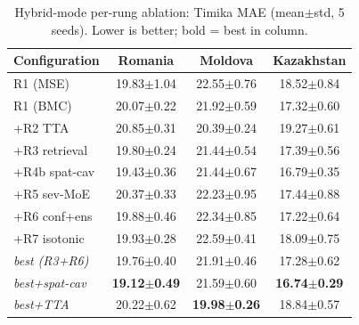 \begin{table}[t]
\centering\small
\caption{Hybrid-mode per-rung ablation: Timika MAE (mean$\pm$std, 5 seeds). Lower is better; bold = best in column.}
\label{tab:abl_fusion}
\setlength{\tabcolsep}{4pt}
\begin{tabular}{l c c c}
\toprule
Configuration & Romania & Moldova & Kazakhstan \\
\midrule
R1 (MSE) & 19.83$\pm$1.04 & 22.55$\pm$0.76 & 18.52$\pm$0.84 \\
R1 (BMC) & 20.07$\pm$0.22 & 21.92$\pm$0.59 & 17.32$\pm$0.60 \\
+R2 TTA & 20.85$\pm$0.31 & 20.39$\pm$0.24 & 19.27$\pm$0.61 \\
+R3 retrieval & 19.80$\pm$0.24 & 21.44$\pm$0.54 & 17.39$\pm$0.56 \\
+R4b spat-cav & 19.43$\pm$0.36 & 21.44$\pm$0.67 & 16.79$\pm$0.35 \\
+R5 sev-MoE & 20.37$\pm$0.33 & 22.23$\pm$0.95 & 17.44$\pm$0.88 \\
+R6 conf+ens & 19.88$\pm$0.46 & 22.34$\pm$0.85 & 17.22$\pm$0.64 \\
+R7 isotonic & 19.93$\pm$0.28 & 22.59$\pm$0.41 & 18.09$\pm$0.75 \\
\textit{best (R3+R6)} & 19.76$\pm$0.40 & 21.91$\pm$0.46 & 17.28$\pm$0.62 \\
\textit{best+spat-cav} & \textbf{19.12$\pm$0.49} & 21.59$\pm$0.60 & \textbf{16.74$\pm$0.29} \\
\textit{best+TTA} & 20.22$\pm$0.62 & \textbf{19.98$\pm$0.26} & 18.84$\pm$0.57 \\
\bottomrule
\end{tabular}
\end{table}